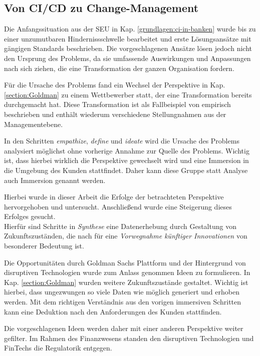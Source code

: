 \subsection{Von CI/CD zu Change-Management}
Die Anfangssituation aus der \ac{SEU} in Kap. \ref{grundlagen:ci-in-banken} wurde bis zu einer unzumutbaren Hindernissschwelle bearbeitet und erste Lösungsansätze mit gängigen Standards beschrieben. Die vorgeschlagenen Ansätze lösen jedoch nicht den Ursprung des Problems, da sie umfassende Auswirkungen und Anpassungen nach sich ziehen, die eine Transformation der ganzen Organisation fordern. 

Für die Ursache des Problems fand ein Wechsel der Perspektive in Kap. \ref{section:Goldman} zu einem Wettbewerber statt, der eine Transformation bereits durchgemacht hat. Diese Transformation ist als Fallbeispiel von \citet{Gupta:2017} empirisch beschrieben und enthält wiederum verschiedene Stellungnahmen aus der Managementebene.

In den Schritten \emph{empathize}, \emph{define} und \emph{ideate} wird die Ursache des Problems analysiert möglichst ohne vorherige Annahme zur Quelle des Problems. Wichtig ist, dass hierbei wirklich die Perspektive gewechselt wird und eine Immersion in die Umgebung des Kunden stattfindet. Daher kann diese Gruppe statt Analyse \cite{yüksel:digit} auch Immersion genannt werden. 

Hierbei wurde in dieser Arbeit die Erfolge der betrachteten Perspektive hervorgehoben und untersucht. Anschließend wurde eine Steigerung dieses Erfolges gesucht.
\medskip
\\
Hierfür sind Schritte in \emph{Synthese} eine Datenerhebung \cite[S. 61]{yüksel:digit} durch Gestaltung von Zukunftszuständen, die nach \citet[S. 14]{Alt2017} für eine \emph{Vorwegnahme künftiger Innovationen} von besonderer Bedeutung ist. 

Die Opportunitäten durch Goldman Sachs Plattform \cite{Gupta:2017} und der Hintergrund von disruptiven Technologien \cite{Fernandez:2020} wurde zum Anlass genommen Ideen zu formulieren. In Kap. \ref{section:Goldman} wurden weitere Zukunftszustände gestaltet.
Wichtig ist hierbei, dass ungezwungen so viele Daten wie möglich generiert und erhoben werden. Mit dem richtigen Verständnis aus den vorigen immersiven Schritten kann eine Deduktion nach den Anforderungen des Kunden stattfinden. 

Die vorgeschlagenen Ideen werden daher mit einer anderen Perspektive weiter gefilter. Im Rahmen des Finanzwesens standen den disruptiven Technologien und FinTechs die Regulatorik entgegen.

